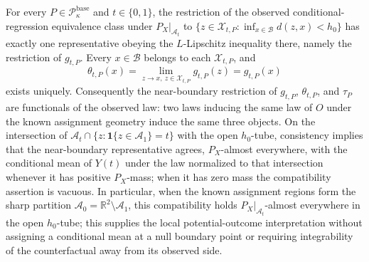 For every \(P\in\mathcal P_{\kappa}^{\mathrm{base}}\) and \(t\in\{0,1\}\), the restriction of the observed conditional-regression equivalence class under \(P_X|_{\mathcal A_t}\) to \(\{z\in\mathcal X_{t,P}:\inf_{x\in\mathcal B}d(z,x)<h_0\}\) has exactly one representative obeying the \(L\)-Lipschitz inequality there, namely the restriction of \(g_{t,P}\). Every \(x\in\mathcal B\) belongs to each \(\mathcal X_{t,P}\), and
\[
\theta_{t,P}(x)=\lim_{z\to x,\ z\in\mathcal X_{t,P}}g_{t,P}(z)=g_{t,P}(x)
\]
exists uniquely. Consequently the near-boundary restriction of \(g_{t,P}\), \(\theta_{t,P}\), and \(\tau_P\) are functionals of the observed law: two laws inducing the same law of \(O\) under the known assignment geometry induce the same three objects. On the intersection of \(\mathcal A_t\cap\{z:\mathbf 1\{z\in\mathcal A_1\}=t\}\) with the open \(h_0\)-tube, consistency implies that the near-boundary representative agrees, \(P_X\)-almost everywhere, with the conditional mean of \(Y(t)\) under the law normalized to that intersection whenever it has positive \(P_X\)-mass; when it has zero mass the compatibility assertion is vacuous. In particular, when the known assignment regions form the sharp partition \(\mathcal A_0=\mathbb R^2\setminus\mathcal A_1\), this compatibility holds \(P_X|_{\mathcal A_t}\)-almost everywhere in the open \(h_0\)-tube; this supplies the local potential-outcome interpretation without assigning a conditional mean at a null boundary point or requiring integrability of the counterfactual away from its observed side.